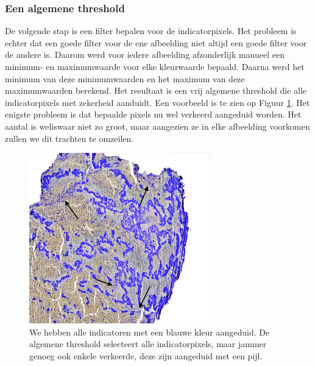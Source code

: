 \documentclass[a4paper,kulak]{kulakarticle}
\begin{document}
\subsubsection{Een algemene threshold}
De volgende stap is een filter bepalen voor de indicatorpixels. Het probleem is echter dat een goede filter voor de ene afbeelding niet altijd een goede filter voor de andere is. Daarom werd voor iedere afbeelding afzonderlijk manueel een minimum- en maximumwaarde voor elke kleurwaarde bepaald. Daarna werd het minimum van deze minimumwaarden en het maximum van deze maximumwaarden berekend. Het resultaat is een vrij algemene threshold die alle indicatorpixels met zekerheid aanduidt. Een voorbeeld is te zien op Figuur \ref{figuur alg_tresh}. Het enigste probleem is dat bepaalde pixels nu wel verkeerd aangeduid worden. Het aantal is weliswaar niet zo groot, maar aangezien ze in elke afbeelding voorkomen zullen we dit trachten te omzeilen.
\begin{figure}[H]
	\centering
	\includegraphics[width = 0.7\textwidth]{algemene_threshold}
	
	\caption{We hebben alle indicatoren met een blauwe kleur aangeduid. De algemene threshold selecteert alle indicatorpixels, maar jammer genoeg ook enkele verkeerde, deze zijn aangeduid met een pijl.}
	\label{figuur alg_tresh}
\end{figure}
\end{document}
